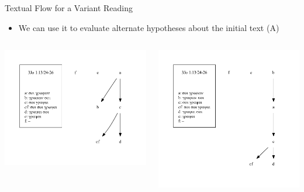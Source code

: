 \documentclass[10pt]{beamer}
\begin{document}
	\begin{frame}{Textual Flow for a Variant Reading}
		\begin{itemize}
			\item We can use it to evaluate alternate hypotheses about the initial text (A)
		\end{itemize}
		\begin{columns}
			\begin{column}{0.45\textwidth}
				\includegraphics[width=\textwidth]{../graphics/B25K1V13U24-26-local-stemma-incomplete.pdf}
			\end{column}
			\begin{column}{0.45\textwidth}
				\includegraphics[width=\textwidth]{../graphics/B25K1V13U24-26-local-stemma-b-initial.pdf}
			\end{column}
		\end{columns}
	\end{frame}
\end{document}
